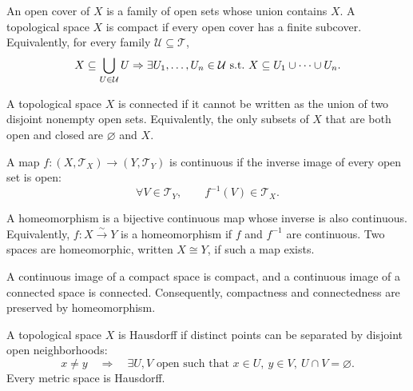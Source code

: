     \begin{definition}[Compactness]
        An open cover of $X$ is a family of open sets whose union contains
        $X$. A topological space $X$ is compact if every open cover has a finite
        subcover. Equivalently, for every family $\mathcal{U}\subseteq\mathcal{T}$,
        \[
            X\subseteq\bigcup_{U\in\mathcal{U}}U
            \Rightarrow
            \exists U_1,\dots,U_n\in\mathcal{U}
            \ \textnormal{s.t.}\
            X\subseteq U_1\cup\cdots\cup U_n.
        \]
    \end{definition}

    \begin{definition}[Connectedness]
        A topological space $X$ is connected if it cannot be written as the union
        of two disjoint nonempty open sets. Equivalently, the only subsets of
        $X$ that are both open and closed are $\varnothing$ and $X$.
    \end{definition}


    \begin{definition}
        A map $f\colon (X,\mathcal{T}_X)\to(Y,\mathcal{T}_Y)$ is continuous if the
        inverse image of every open set is open:
        \[
            \forall V\in\mathcal{T}_Y,
            \qquad
            f^{-1}(V)\in\mathcal{T}_X.
        \]
    \end{definition}

    \begin{definition}[Homeomorphism]
        A homeomorphism is a bijective continuous map whose inverse is also
        continuous. Equivalently, $f\colon X\xrightarrow{\sim}Y$ is a homeomorphism
        if $f$ and $f^{-1}$ are continuous. Two spaces are homeomorphic, written
        $X\cong Y$, if such a map exists.
    \end{definition}


    \begin{theorem}
        A continuous image of a compact space is compact, and a continuous
        image of a connected space is connected. Consequently, compactness and
        connectedness are preserved by homeomorphism.
    \end{theorem}

    \begin{definition}
        A topological space $X$ is Hausdorff if distinct points can be separated
        by disjoint open neighborhoods:
        \[
            x\neq y
            \quad\Longrightarrow\quad
            \exists U,V\text{ open such that }x\in U,\ y\in V,\ U\cap V=\varnothing.
        \]
        Every metric space is Hausdorff.
    \end{definition}

